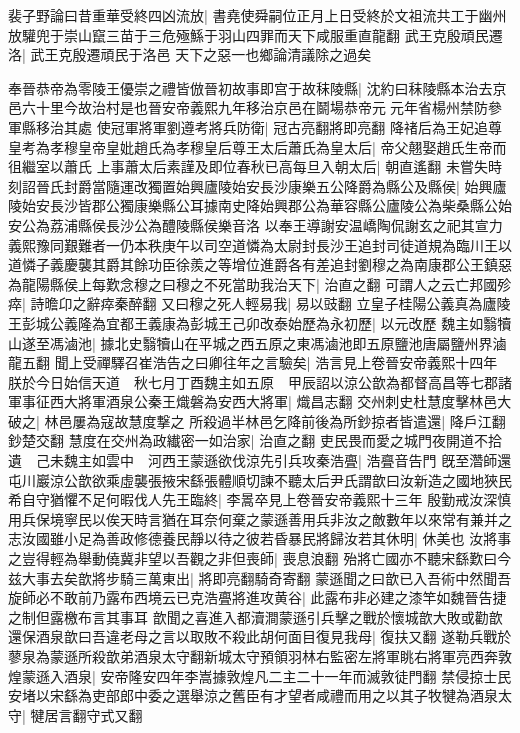 裴子野論曰昔重華受終四凶流放|{
	書堯使舜嗣位正月上日受終於文祖流共工于幽州放驩兜于崇山竄三苗于三危殛鯀于羽山四罪而天下咸服重直龍翻}
武王克殷頑民遷洛|{
	武王克殷遷頑民于洛邑}
天下之惡一也鄉論清議除之過矣

奉晉恭帝為零陵王優崇之禮皆倣晉初故事即宫于故秣陵縣|{
	沈約曰秣陵縣本治去京邑六十里今故治村是也晉安帝義熙九年移治京邑在鬬場恭帝元元年省楊州禁防參軍縣移治其處}
使冠軍將軍劉遵考將兵防衛|{
	冠古亮翻將即亮翻}
降禇后為王妃追尊皇考為孝穆皇帝皇妣趙氏為孝穆皇后尊王太后蕭氏為皇太后|{
	帝父翹娶趙氏生帝而徂繼室以蕭氏}
上事蕭太后素謹及即位春秋已高每旦入朝太后|{
	朝直遙翻}
未嘗失時刻詔晉氏封爵當隨運改獨置始興廬陵始安長沙康樂五公降爵為縣公及縣侯|{
	始興廬陵始安長沙皆郡公獨康樂縣公耳據南史降始興郡公為華容縣公廬陵公為柴桑縣公始安公為荔浦縣侯長沙公為醴陵縣侯樂音洛}
以奉王導謝安温嶠陶侃謝玄之祀其宣力義熙豫同艱難者一仍本秩庚午以司空道憐為太尉封長沙王追封司徒道規為臨川王以道憐子義慶襲其爵其餘功臣徐羨之等增位進爵各有差追封劉穆之為南康郡公王鎮惡為龍陽縣侯上每歎念穆之曰穆之不死當助我治天下|{
	治直之翻}
可謂人之云亡邦國殄瘁|{
	詩曕卬之辭瘁秦醉翻}
又曰穆之死人輕易我|{
	易以豉翻}
立皇子桂陽公義真為廬陵王彭城公義隆為宜都王義康為彭城王己卯改泰始歷為永初歷|{
	以元改歷}
魏主如翳犢山遂至馮滷池|{
	據北史翳犢山在平城之西五原之東馮滷池即五原鹽池唐屬鹽州界滷龍五翻}
聞上受禪驛召崔浩告之曰卿往年之言驗矣|{
	浩言見上卷晉安帝義熙十四年}
朕於今日始信天道　秋七月丁酉魏主如五原　甲辰詔以涼公歆為都督高昌等七郡諸軍事征西大將軍酒泉公秦王熾磐為安西大將軍|{
	熾昌志翻}
交州刺史杜慧度擊林邑大破之|{
	林邑屢為寇故慧度撃之}
所殺過半林邑乞降前後為所鈔掠者皆遣還|{
	降戶江翻鈔楚交翻}
慧度在交州為政纎密一如治家|{
	治直之翻}
吏民畏而愛之城門夜開道不拾遺　己未魏主如雲中　河西王蒙遜欲伐涼先引兵攻秦浩亹|{
	浩亹音告門}
旣至濳師還屯川巖涼公歆欲乘虛襲張掖宋繇張體順切諫不聽太后尹氏謂歆曰汝新造之國地狹民希自守猶懼不足何暇伐人先王臨終|{
	李暠卒見上卷晉安帝義熙十三年}
殷勤戒汝深慎用兵保境寧民以俟天時言猶在耳奈何棄之蒙遜善用兵非汝之敵數年以來常有兼并之志汝國雖小足為善政修德養民靜以待之彼若昏暴民將歸汝若其休明|{
	休美也}
汝將事之豈得輕為舉動僥冀非望以吾觀之非但喪師|{
	喪息浪翻}
殆將亡國亦不聽宋繇歎曰今兹大事去矣歆將步騎三萬東出|{
	將即亮翻騎奇寄翻}
蒙遜聞之曰歆已入吾術中然聞吾旋師必不敢前乃露布西境云已克浩亹將進攻黄谷|{
	此露布非必建之漆竿如魏晉告捷之制但露檄布言其事耳}
歆聞之喜進入都瀆澗蒙遜引兵擊之戰於懷城歆大敗或勸歆還保酒泉歆曰吾違老母之言以取敗不殺此胡何面目復見我母|{
	復扶又翻}
遂勒兵戰於蓼泉為蒙遜所殺歆弟酒泉太守翻新城太守預領羽林右監密左將軍眺右將軍亮西奔敦煌蒙遜入酒泉|{
	安帝隆安四年李嵩據敦煌凡二主二十一年而滅敦徒門翻}
禁侵掠士民安堵以宋繇為吏部郎中委之選舉涼之舊臣有才望者咸禮而用之以其子牧犍為酒泉太守|{
	犍居言翻守式又翻}
